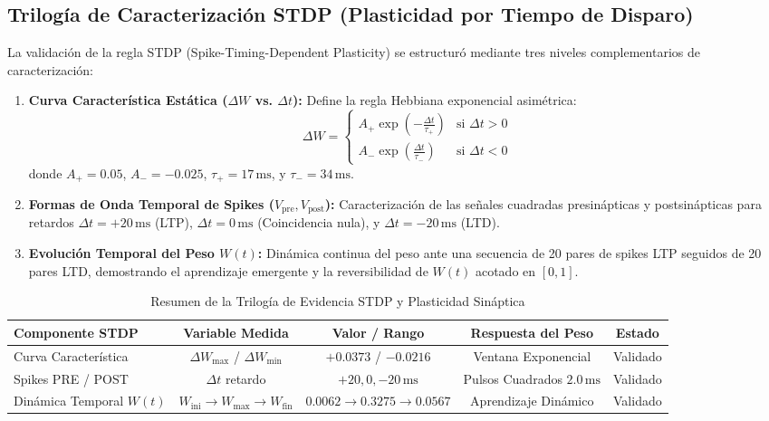 \subsection{Trilogía de Caracterización STDP (Plasticidad por Tiempo de Disparo)}
La validación de la regla STDP (Spike-Timing-Dependent Plasticity) se estructuró mediante tres niveles complementarios de caracterización:

\begin{enumerate}
    \item \textbf{Curva Característica Estática ($\Delta W$ vs. $\Delta t$):} Define la regla Hebbiana exponencial asimétrica:
    \begin{equation}
        \Delta W = \begin{cases}
            A_+ \exp\left(-\frac{\Delta t}{\tau_+}\right) & \text{si } \Delta t > 0 \\[8pt]
            A_- \exp\left(\frac{\Delta t}{\tau_-}\right) & \text{si } \Delta t < 0
        \end{cases}
    \end{equation}
    donde $A_+ = 0.05$, $A_- = -0.025$, $\tau_+ = 17\,\text{ms}$, y $\tau_- = 34\,\text{ms}$.
    \item \textbf{Formas de Onda Temporal de Spikes ($V_{\text{pre}}, V_{\text{post}}$):} Caracterización de las señales cuadradas presinápticas y postsinápticas para retardos $\Delta t = +20\,\text{ms}$ (LTP), $\Delta t = 0\,\text{ms}$ (Coincidencia nula), y $\Delta t = -20\,\text{ms}$ (LTD).
    \item \textbf{Evolución Temporal del Peso $W(t)$:} Dinámica continua del peso ante una secuencia de 20 pares de spikes LTP seguidos de 20 pares LTD, demostrando el aprendizaje emergente y la reversibilidad de $W(t)$ acotado en $[0, 1]$.
\end{enumerate}

\begin{table}[h!]
    \centering
    \caption{Resumen de la Trilogía de Evidencia STDP y Plasticidad Sináptica}
    \label{tab:stdp_trilogia}
    \begin{tabular}{lcccc}
        \toprule
        \textbf{Componente STDP} & \textbf{Variable Medida} & \textbf{Valor / Rango} & \textbf{Respuesta del Peso} & \textbf{Estado} \\
        \midrule
        Curva Característica & $\Delta W_{\max}$ / $\Delta W_{\min}$ & $+0.0373$ / $-0.0216$ & Ventana Exponencial & Validado \\
        Spikes PRE / POST & $\Delta t$ retardo & $+20, 0, -20\,\text{ms}$ & Pulsos Cuadrados $2.0\,\text{ms}$ & Validado \\
        Dinámica Temporal $W(t)$ & $W_{\text{ini}} \rightarrow W_{\max} \rightarrow W_{\text{fin}}$ & $0.0062 \rightarrow 0.3275 \rightarrow 0.0567$ & Aprendizaje Dinámico & Validado \\
        \bottomrule
    \end{tabular}
\end{table}

